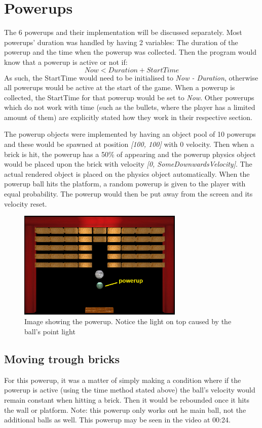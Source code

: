 \chapter{Powerups}

The 6 powerups and their implementation will be discussed separately. Most powerups' duration was handled by having 2 variables: The duration of the powerup and the time when the powerup was collected. Then the program would know that a powerup is active or not if:
\[ Now < Duration + StartTime \]
As such, the StartTime would need to be initialised to \textit{Now - Duration}, otherwise all powerups would be active at the start of the game. When a powerup is collected, the StartTime for that powerup would be set to \textit{Now}. Other powerups which do not work with time (such as the bullets, where the player has a limited amount of them) are explicitly stated how they work in their respective section.

The powerup objects were implemented by having an object pool of 10 powerups and these would be spawned at position \textit{[100, 100]} with 0 velocity. Then when a brick is hit, the powerup has a 50\% of appearing and the powerup physics object would be placed upon the brick with velocity \textit{[0, SomeDownwardsVelocity]}. The actual rendered object is placed on the physics object automatically. When the powerup ball hits the platform, a random powerup is given to the player with equal probability. The powerup would then be put away from the screen and its velocity reset.

\begin{figure}[H]
	\centering
	\includegraphics[width=0.7\textwidth]{Images/powerup.png}
	\caption{Image showing the powerup. Notice the light on top caused by the ball's point light}
\end{figure}

\section{Moving trough bricks}
For this powerup, it was a matter of simply making a condition where if the powerup is active (using the time method stated above) the ball's velocity would remain constant when hitting a brick. Then it would be rebounded once it hits the wall or platform. Note: this powerup only works ont he main ball, not the additional balls as well. This powerup may be seen in the video at 00:24.


